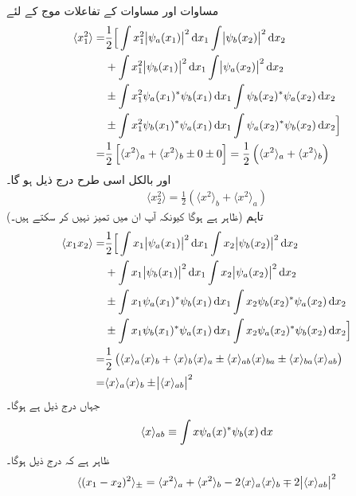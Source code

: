  مساوات   اور  مساوات   کے تفاعلات موج کے لئے 
\begin{gather*}
	\begin{aligned}
		\langle x_1^2 \rangle =& \frac{1}{2}\Big[\int x_1^2\abs{\psi_a(x_1)}^2\dif x_1\int\abs{\psi_b(x_2)}^2\dif x_2 \\
		&+ \int x_1^2\abs{\psi_b(x_1)}^2\dif x_1\int\abs{\psi_a(x_2)}^2\dif x_2 \\
		&\pm\int x_1^2\psi_a(x_1)^*\psi_b(x_1)\dif x_1\int\psi_b(x_2)^*\psi_a(x_2)\dif x_2 \\
		&\pm\int x_1^2\psi_b(x_1)^*\psi_a(x_1)\dif x_1\int\psi_a(x_2)^*\psi_b(x_2)\dif x_2\Big] \\
		=& \frac{1}{2}\left[\langle x^2 \rangle_a+\langle x^2 \rangle_b\pm0\pm0\right]=\frac{1}{2}\left(\langle x^2 \rangle_a+\langle x^2\rangle_b\right)
	\end{aligned}
\end{gather*}
اور بالکل اسی طرح درج ذیل ہو گا۔
\begin{align*}
	\langle x_2^2 \rangle=\frac{1}{2}\left(\langle x^2 \rangle_b+\langle x^2 \rangle_a\right)
\end{align*}
(ظاہر ہے  ہوگا کیونکہ آپ ان میں تمیز نہیں کر سکتے ہیں۔)  تاہم
\begin{gather*}
	\begin{aligned}
		\langle x_1x_2 \rangle=&\frac{1}{2}\Big[\int x_1\abs{\psi_a(x_1)}^2\dif x_1\int x_2\abs{\psi_b(x_2)}^2\dif x_2 \\
		&+\int x_1\abs{\psi_b(x_1)}^2\dif x_1\int x_2\abs{\psi_a(x_2)}^2\dif x_2 \\
		&\pm\int x_1\psi_a(x_1)^*\psi_b(x_1)\dif x_1\int x_2\psi_b(x_2)^*\psi_a(x_2)\dif x_2 \\
		&\pm\int x_1\psi_b(x_1)^*\psi_a(x_1)\dif x_1\int x_2\psi_a(x_2)^*\psi_b(x_2)\dif x_2\Big] \\
		=& \frac{1}{2}\left(\langle x \rangle_a\langle x \rangle_b+\langle x \rangle_b\langle x \rangle_a\pm\langle x \rangle_{ab}\langle x \rangle_{ba}\pm\langle x \rangle_{ba}\langle x \rangle_{ab}\right)\\
		=&\langle x \rangle_a\langle x \rangle_b\pm\abs{\langle x \rangle_{ab}}^2
	\end{aligned}
\end{gather*}
جہاں درج ذیل ہے  ہوگا۔
\begin{align}\label{مساوات_متماثل_کے_بیچ}
	\langle x \rangle_{ab}\equiv\int x\psi_a(x)^*\psi_b(x)\dif x
\end{align}
ظاہر ہے کہ درج ذیل ہوگا۔
\begin{align}\label{مساوات_متماثل_فاصلہ_متماثل}
	\langle(x_1-x_2)^2\rangle_{\pm}=\langle x^2\rangle_a+\langle x^2 \rangle_b-2\langle x \rangle_a\langle x \rangle_b\mp2\abs{\langle x \rangle_{ab}}^2
\end{align}

